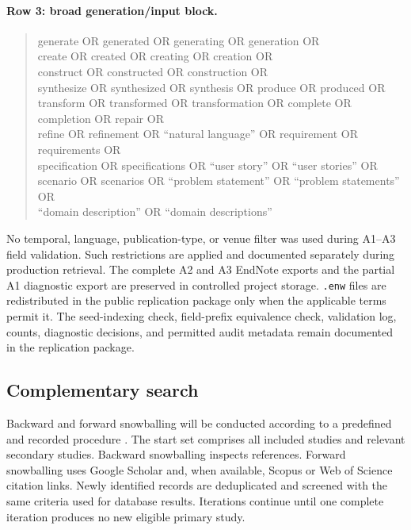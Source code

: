 \paragraph{Row 3: broad generation/input block.}

\begin{quote}
\begin{minipage}{0.96\textwidth}
\scriptsize\ttfamily\raggedright
generate OR generated OR generating OR generation OR\\
create OR created OR creating OR creation OR\\
construct OR constructed OR construction OR\\
synthesize OR synthesized OR synthesis OR produce OR produced OR\\
transform OR transformed OR transformation OR complete OR completion OR repair OR\\
refine OR refinement OR ``natural language'' OR requirement OR requirements OR\\
specification OR specifications OR ``user story'' OR ``user stories'' OR\\
scenario OR scenarios OR ``problem statement'' OR ``problem statements'' OR\\
``domain description'' OR ``domain descriptions''
\end{minipage}
\end{quote}

No temporal, language, publication-type, or venue filter was used during A1--A3
field validation. Such restrictions are applied and documented separately
during production retrieval. The complete A2 and A3 EndNote exports and the
partial A1 diagnostic export are preserved in controlled project storage.
\texttt{.enw} files are redistributed in the public replication package only when the
applicable terms permit it. The seed-indexing check, field-prefix equivalence
check, validation log, counts, diagnostic decisions, and permitted audit
metadata remain documented in the replication package.


\subsection{Complementary search}

Backward and forward snowballing will be conducted according to a predefined and recorded procedure \cite{Wohlin2014Snowballing}. The start set comprises all included studies and relevant secondary studies. Backward snowballing inspects references. Forward snowballing uses Google Scholar and, when available, Scopus or Web of Science citation links. Newly identified records are deduplicated and screened with the same criteria used for database results. Iterations continue until one complete iteration produces no new eligible primary study.

